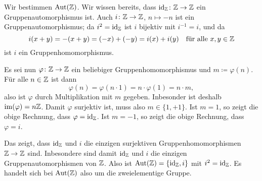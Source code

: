 \begin{bsp}
 Wir bestimmen $\mathrm{Aut}(\mathbb{Z})$. Wir wissen bereits, dass $\mathrm{id}_{\mathbb{Z}} \colon \mathbb{Z} \to \mathbb{Z}$ ein Gruppenautomorphismus ist. Auch $i \colon \mathbb{Z} \to \mathbb{Z}$, $n \mapsto -n$ ist ein Gruppenautomorphismus; da $i^2 = \mathrm{id}_{\mathbb{Z}}$ ist $i$ bijektiv mit $i^{-1} = i$, und da
 \[
  i(x+y)
  = -(x+y)
  = (-x) + (-y)
  = i(x) + i(y)
  \quad
  \text{für alle $x,y \in \mathbb{Z}$}
 \]
 ist $i$ ein Gruppenhomomorphismus.
 
 Es sei nun $\varphi \colon \mathbb{Z} \to \mathbb{Z}$ ein beliebiger Gruppenhomomorphismus und $m \coloneqq \varphi(n)$. Für alle $n \in \mathbb{Z}$ ist dann
 \[
  \varphi(n)
  = \varphi(n \cdot 1)
  = n \cdot \varphi(1)
  = n \cdot m,
 \]
 also ist $\varphi$ durch Multiplikation mit $m$ gegeben. Inbesonder ist deshalb $\mathrm{im}(\varphi) = n\mathbb{Z}$. Damit $\varphi$ surjektiv ist, muss also $m \in \{1,+1\}$. Ist $m = 1$, so zeigt die obige Rechnung, dass $\varphi = \mathrm{id}_{\mathbb{Z}}$. Ist $m = -1$, so zeigt die obige Rechnung, dass $\varphi = i$.
 
 Das zeigt, dass $\mathrm{id}_{\mathbb{Z}}$ und $i$ die einzigen surjektiven Gruppenhomomorphismen $\mathbb{Z} \to \mathbb{Z}$ sind. Inbesondere sind damit $\mathrm{id}_{\mathbb{Z}}$ und $i$ die einzigen Gruppenautomorphismen von $\mathbb{Z}$. Also ist $\mathrm{Aut}(\mathbb{Z}) = \{\mathrm{id}_{\mathbb{Z}}, i\}$ mit $i^2 = \mathrm{id}_{\mathbb{Z}}$. Es handelt sich bei $\mathrm{Aut}(\mathbb{Z})$ also um die zweielementige Gruppe.
\end{bsp}


